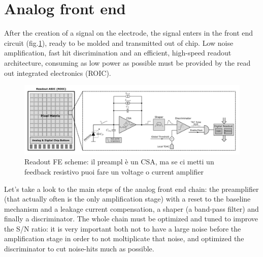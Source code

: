 \section{Analog front end}
   After the creation of a signal on the electrode, the signal enters in the front end circuit (fig.\ref{fig:readout_scheme}), ready to be molded and transmitted out of chip.
   Low noise amplification, fast hit discrimination and an efficient, high-speed readout architecture, consuming as low power as possible  must be provided by the read out integrated electronics (ROIC).\\
   \begin{figure}
      \centering
      \includegraphics[width=1.\linewidth]{figures/Pixel_detectors/readout_scheme.png}
      \caption{Readout FE scheme: il preampl è un CSA, ma se ci metti un feedback resistivo puoi fare un voltage o current amplifier}
      \label{fig:readout_scheme}
   \end{figure}
   Let's take a look to the main steps of the analog front end chain: the preamplifier (that actually often is the only amplification stage) with a reset to the baseline mechanism and a leakage current compensation, a shaper (a band-pass filter) and finally a discriminator. The whole chain must be optimized and tuned to improve the S/N ratio: it is very important both not to have a large noise before the amplification stage in order to not moltiplicate that noise, and optimized the discriminator to cut noise-hits much as possible.

